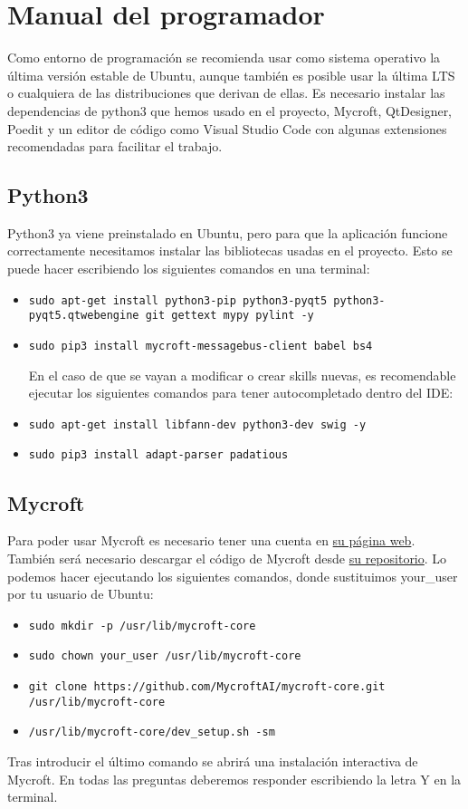 \section{Manual del programador}
Como entorno de programación se recomienda usar como sistema operativo la última versión estable de Ubuntu, aunque también es posible usar la última LTS o cualquiera de las distribuciones que derivan de ellas. Es necesario instalar las dependencias de python3 que hemos usado en el proyecto, Mycroft, QtDesigner, Poedit y un editor de código como Visual Studio Code con algunas extensiones recomendadas para facilitar el trabajo.

\subsection{Python3}
Python3 ya viene preinstalado en Ubuntu, pero para que la aplicación funcione correctamente necesitamos instalar las bibliotecas usadas en el proyecto. Esto se puede hacer escribiendo los siguientes comandos en una terminal:
\begin{itemize}
    \item \texttt{sudo apt-get install python3-pip python3-pyqt5 \newline python3-pyqt5.qtwebengine git gettext mypy pylint -y}
    \item \texttt{sudo pip3 install mycroft-messagebus-client babel bs4}
    
    En el caso de que se vayan a modificar o crear skills nuevas, es recomendable ejecutar los siguientes comandos para tener autocompletado dentro del IDE:
    \item \texttt{sudo apt-get install libfann-dev python3-dev swig -y}
    \item \texttt{sudo pip3 install adapt-parser padatious}
\end{itemize}

\subsection{Mycroft}
Para poder usar Mycroft es necesario tener una cuenta en \href{https://mycroft.ai}{su página web}. También será necesario descargar el código de Mycroft desde \href{https://github.com/MycroftAI/mycroft-core}{su repositorio}. Lo podemos hacer ejecutando los siguientes comandos, donde sustituimos your\_user por tu usuario de Ubuntu:
\begin{itemize}
    \item \texttt{sudo mkdir -p /usr/lib/mycroft-core}
    \item \texttt{sudo chown your\_user /usr/lib/mycroft-core}
    \item \texttt{git clone https://github.com/MycroftAI/mycroft-core.git \newline /usr/lib/mycroft-core}
    \item \texttt{/usr/lib/mycroft-core/dev\_setup.sh -sm}
\end{itemize}
Tras introducir el último comando se abrirá una instalación interactiva de Mycroft. En todas las preguntas deberemos responder escribiendo la letra Y en la terminal.

